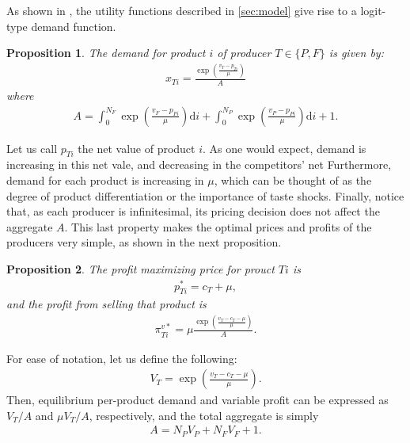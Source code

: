 \documentclass[a4paper]{article}
\newtheorem{proposition}{Proposition}
\newcommand{\di}{\mathrm{d}i}
\begin{document}
As shown in \textcite[]{anderson2021hybrid}, the utility functions described in \cref{sec:model} give rise to a logit-type demand function.
\begin{proposition}
    The demand for product $i$ of producer $T \in \{P, F\}$ is given by:
    \begin{align*}
        x_{Ti} = \frac{\exp\left( \frac{v_T - p_{Ti}}{\mu} \right)}{A}
    \end{align*}
    where
    \begin{align}
        A = \int_0^{N_F} \exp\left( \frac{v_F - p_{Fi}}{\mu} \right) \di + \int_0^{N_P} \exp\left( \frac{v_P - p_{Pi}}{\mu} \right) \di + 1.
        \label{eq:aggregate}
    \end{align}
\end{proposition}

Let us call $p_{Ti}$ the net value of product $i$.
As one would expect, demand is increasing in this net vale, and decreasing in the competitors' net 
Furthermore, demand for each product is increasing in $\mu$, which can be thought of as the degree of product differentiation or the importance of taste shocks.
Finally, notice that, as each producer is infinitesimal, its pricing decision does not affect the aggregate $A$.
This last property makes the optimal prices and profits of the producers very simple, as shown in the next proposition.
\begin{proposition}
    The profit maximizing price for prouct $Ti$ is
    \begin{align*}
        p^*_{Ti} = c_T + \mu,
    \end{align*}
    and the profit from selling that product is
    \begin{align}
        \pi^{v*}_{Ti} = \mu \frac{\exp \left( \frac{v_T - c_T - \mu}{\mu} \right)}{A}.
        \label{eq:optimal_profit}
    \end{align}
\end{proposition}

For ease of notation, let us define the following:
\begin{align*}
    V_T = \exp \left( \frac{v_T - c_T - \mu}{\mu} \right).
\end{align*}
Then, equilibrium per-product demand and variable profit can be expressed as $V_T/ A$ and $\mu V_T/ A$, respectively, and the total aggregate is simply
\begin{align*}
    A = N_P V_P + N_F V_F + 1.
\end{align*}
\end{document}
